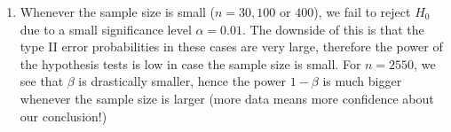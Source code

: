 {\begin{enumerate}[label=(\alph*)]
        \item Whenever the sample size is small ($n = 30, 100$ or $400$), we fail to reject $H_0$ due to a small significance level $\alpha = 0.01$.
        The downside of this is that the type II error probabilities in these cases are very large, therefore the power of the hypothesis tests is
        low in case the sample size is small.
        For $n = 2550$, we see that $\beta$ is drastically smaller, hence the power $1 - \beta$ is much bigger whenever the sample size is larger (more data means more confidence about our conclusion!)
    \end{enumerate}
}